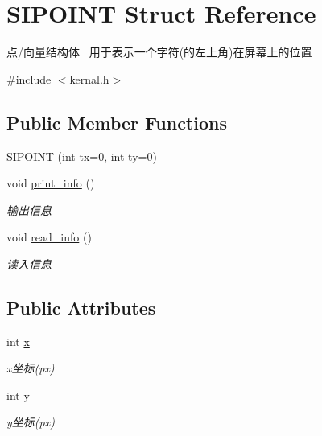 \hypertarget{struct_s_i_p_o_i_n_t}{}\section{S\+I\+P\+O\+I\+NT Struct Reference}
\label{struct_s_i_p_o_i_n_t}


点/向量结构体~\newline
用于表示一个字符(的左上角)在屏幕上的位置  




{\ttfamily \#include $<$kernal.\+h$>$}

\subsection*{Public Member Functions}
\begin{DoxyCompactItemize}
\item 
\hyperlink{struct_s_i_p_o_i_n_t_a1695c9d8ff55b1169de1c6a9c379687c}{S\+I\+P\+O\+I\+NT} (int tx=0, int ty=0)
\item 
\mbox{\label{struct_s_i_p_o_i_n_t_addf5c16437bb7c30f8775e5ca430b66d}} 
void \hyperlink{struct_s_i_p_o_i_n_t_addf5c16437bb7c30f8775e5ca430b66d}{print\+\_\+info} ()
\begin{DoxyCompactList}\small\item\em 输出信息 \end{DoxyCompactList}\item 
\mbox{\label{struct_s_i_p_o_i_n_t_a92506794ca743f148749ee05ca71212e}} 
void \hyperlink{struct_s_i_p_o_i_n_t_a92506794ca743f148749ee05ca71212e}{read\+\_\+info} ()
\begin{DoxyCompactList}\small\item\em 读入信息 \end{DoxyCompactList}\end{DoxyCompactItemize}
\subsection*{Public Attributes}
\begin{DoxyCompactItemize}
\item 
\mbox{\label{struct_s_i_p_o_i_n_t_a2375f32079fea6d73191df2bfe08cb1d}} 
int \hyperlink{struct_s_i_p_o_i_n_t_a2375f32079fea6d73191df2bfe08cb1d}{x}
\begin{DoxyCompactList}\small\item\em x坐标(px) \end{DoxyCompactList}\item 
\mbox{\label{struct_s_i_p_o_i_n_t_a1ed590aa0d87cf51a0d30a44d1c03e93}} 
int \hyperlink{struct_s_i_p_o_i_n_t_a1ed590aa0d87cf51a0d30a44d1c03e93}{y}
\begin{DoxyCompactList}\small\item\em y坐标(px) \end{DoxyCompactList}\end{DoxyCompactItemize}
